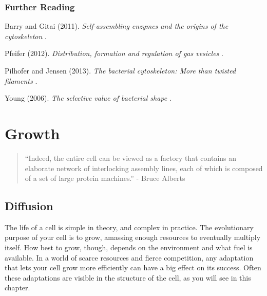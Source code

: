 \documentclass[]{tufte-book}
\begin{document}
\hypertarget{further-reading-2}{%
\subsection*{Further Reading}\label{further-reading-2}}

Barry and Gitai (2011). \emph{Self-assembling enzymes and the origins of the cytoskeleton} \citep{barry2011}.

Pfeifer (2012). \emph{Distribution, formation and regulation of gas vesicles} \citep{pfeifer2012}.

Pilhofer and Jensen (2013). \emph{The bacterial cytoskeleton: More than twisted filaments} \citep{pilhofer2013}.

Young (2006). \emph{The selective value of bacterial shape} \citep{young2006}.

\hypertarget{growth}{%
\chapter{Growth}\label{growth}}

\begin{quote}
``Indeed, the entire cell can be viewed as a factory that contains an elaborate network of interlocking assembly lines, each of which is composed of a set of large protein machines.''
- Bruce Alberts \citep{alberts1998}
\end{quote}

\hypertarget{diffusion}{%
\section{Diffusion}\label{diffusion}}

The life of a cell is simple in theory, and complex in practice. The evolutionary purpose of your cell is to grow, amassing enough resources to eventually multiply itself. How best to grow, though, depends on the environment and what fuel is available. In a world of scarce resources and fierce competition, any adaptation that lets your cell grow more efficiently can have a big effect on its success. Often these adaptations are visible in the structure of the cell, as you will see in this chapter.
\end{document}
